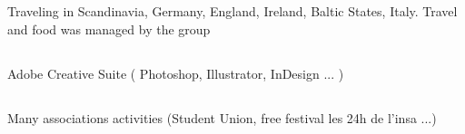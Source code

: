 	\subsection{}
		{Traveling in Scandinavia, Germany, England, Ireland, Baltic States, Italy. Travel and food was managed by the group}

	\subsection{}
		{Adobe Creative Suite ( Photoshop, Illustrator, InDesign ... )}
		
	\subsection{}
		{Many associations activities (Student Union, free festival les 24h de l'insa ...)}
		
